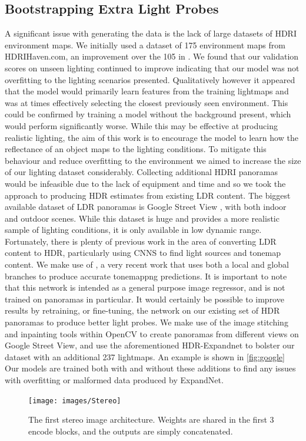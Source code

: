 \documentclass[ %
                    author={Gavin Parker},
                supervisor={Dr. Neill Campbell},
                    degree={MEng},
                     title={Deep Siamese Networks for Illumination Estimation from Stereo Images},
                  subtitle={},
                      type={research},
                      year={2018} ]{dissertation}
\begin{document}
\subsection{Bootstrapping Extra Light Probes}
A significant issue with generating the data is the lack of large datasets of HDRI environment maps. We initially used a dataset of 175 environment maps from HDRIHaven.com, an improvement over the 105 in \cite{RematasCVPR2016}. We found that our validation scores on unseen lighting continued to improve indicating that our model was not overfitting to the lighting scenarios presented. Qualitatively however it appeared that the model would primarily learn features from the training lightmaps and was at times effectively selecting the closest previously seen environment. This could be confirmed by training a model without the background present, which would perform significantly worse. While this may be effective at producing realistic lighting, the aim of this work is to encourage the model to learn how the reflectance of an object maps to the lighting conditions. To mitigate this behaviour and reduce overfitting to the environment we aimed to increase the size of our lighting dataset considerably. 
\newline
Collecting additional HDRI panoramas would be infeasible due to the lack of equipment and time and so we took the approach to producing HDR estimates from existing LDR content. The biggest available dataset of LDR panoramas is Google Street View \cite{GoogleMaps}, with both indoor and outdoor scenes. While this dataset is huge and provides a more realistic sample of lighting conditions, it is only available in low dynamic range. Fortunately, there is plenty of previous work in the area of converting LDR content to HDR, particularly using CNNS to find light sources and tonemap content. We make use of \cite{2018arXiv180302266M}, a very recent work that uses both a local and global branches to produce accurate tonemappng predictions. It is important to note that this network is intended as a general purpose image regressor, and is not trained on panoramas in particular. It would certainly be possible to improve results by retraining, or fine-tuning, the network on our existing set of HDR panoramas to produce better light probes. We make use of the image stitching and inpainting tools within OpenCV to create panoramas from different views on Google Street View, and use the aforementioned HDR-Expandnet to bolster our dataset with an additional 237 lightmaps. An example is shown in \ref{fig:google} Our models are trained both with and without these additions to find any issues with overfitting or malformed data produced by ExpandNet.
\begin{figure}[H]
\centering
\texttt{[image: images/Stereo]}
\caption 
\newline
The first stereo image architecture. Weights are shared in the first 3 encode blocks, and the outputs are simply concatenated.
\label{basic}
\end{figure}
\end{document}
